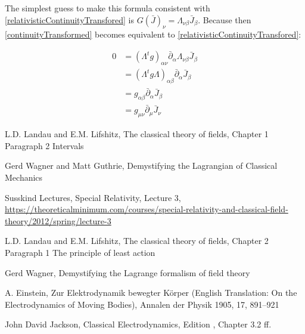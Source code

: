 \documentclass{article}
\begin{document}
The simplest guess to make this formula consistent with \ref{relativisticContinuityTransfored} is $G(\bar{J})_\nu = \Lambda_{\nu\beta} \bar{J}_\beta$.
Because then \ref{continuityTransformed} becomes equivalent to \ref{relativisticContinuityTransfored}:

\begin{align}
    0 & = (\Lambda^t g )_{\alpha\nu} \bar{\partial}_\alpha  \Lambda_{\nu\beta} \bar{J}_\beta \nonumber \\
      & = (\Lambda^t g \Lambda)_{\alpha\beta} \bar{\partial}_\alpha  \bar{J}_\beta \nonumber \\
      & = g_{\alpha\beta} \bar{\partial}_\alpha  \bar{J}_\beta \nonumber \\
      & = g_{\mu\nu} \bar{\partial}_\mu  \bar{J}_\nu \nonumber
\end{align}


\begin{thebibliography}{9}

 L.D. Landau and E.M. Lifshitz, The classical theory of fields, Chapter 1 Paragraph 2 Intervals

 Gerd Wagner and Matt Guthrie, Demystifying the Lagrangian of Classical Mechanics

 Susskind Lectures, Special Relativity, Lecture 3, \url{https://theoreticalminimum.com/courses/special-relativity-and-classical-field-theory/2012/spring/lecture-3}

 L.D. Landau and E.M. Lifshitz, The classical theory of fields, Chapter 2 Paragraph 1 The principle of least action

 Gerd Wagner, Demystifying the Lagrange formalism of field theory

 A. Einstein, Zur Elektrodynamik bewegter K\"{o}rper (English Translation: On the Electrodynamics of Moving Bodies), Annalen der Physik 1905, 17, 891--921

 John David Jackson, Classical Electrodynamics, Edition , Chapter 3.2 ff.

\end{thebibliography}
\end{document}
